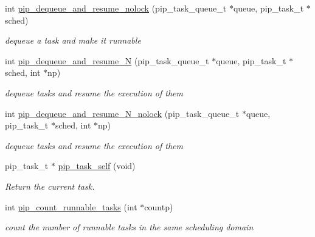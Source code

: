 \begin{DoxyCompactItemize}
\item 
int \hyperlink{group__libpip_gab3c26770ac6de70ad11239dc301bd403}{pip\-\_\-dequeue\-\_\-and\-\_\-resume\-\_\-nolock} (pip\-\_\-task\-\_\-queue\-\_\-t $\ast$queue, pip\-\_\-task\-\_\-t $\ast$sched)
\begin{DoxyCompactList}\small\item\em dequeue a task and make it runnable \end{DoxyCompactList}\end{DoxyCompactItemize}
\begin{DoxyCompactItemize}
\item 
int \hyperlink{group__libpip_gac26e54557d8e89fcdcb52a9df6c65998}{pip\-\_\-dequeue\-\_\-and\-\_\-resume\-\_\-\-N} (pip\-\_\-task\-\_\-queue\-\_\-t $\ast$queue, pip\-\_\-task\-\_\-t $\ast$sched, int $\ast$np)
\begin{DoxyCompactList}\small\item\em dequeue tasks and resume the execution of them \end{DoxyCompactList}\end{DoxyCompactItemize}
\begin{DoxyCompactItemize}
\item 
int \hyperlink{group__libpip_ga939e70924803be491c2f6f10b364e803}{pip\-\_\-dequeue\-\_\-and\-\_\-resume\-\_\-\-N\-\_\-nolock} (pip\-\_\-task\-\_\-queue\-\_\-t $\ast$queue, pip\-\_\-task\-\_\-t $\ast$sched, int $\ast$np)
\begin{DoxyCompactList}\small\item\em dequeue tasks and resume the execution of them \end{DoxyCompactList}\end{DoxyCompactItemize}
\begin{DoxyCompactItemize}
\item 
pip\-\_\-task\-\_\-t $\ast$ \hyperlink{group__libpip_gaf09a1abfd580696c74d4aa7be8255ad0}{pip\-\_\-task\-\_\-self} (void)
\begin{DoxyCompactList}\small\item\em Return the current task. \end{DoxyCompactList}\end{DoxyCompactItemize}
\begin{DoxyCompactItemize}
\item 
int \hyperlink{group__libpip_gaec396f9ee279cbe2d44f9b2ed239eb4a}{pip\-\_\-count\-\_\-runnable\-\_\-tasks} (int $\ast$countp)
\begin{DoxyCompactList}\small\item\em count the number of runnable tasks in the same scheduling domain \end{DoxyCompactList}\end{DoxyCompactItemize}
